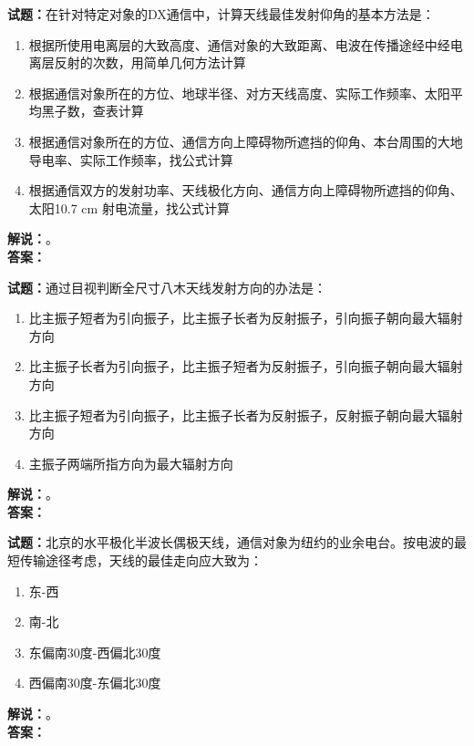 \documentclass{ctexbook}
\begin{document}
\noindent\textbf{试题：}在针对特定对象的DX通信中，计算天线最佳发射仰角的基本方法是：
\begin{enumerate}[leftmargin=3em]
  \item 根据所使用电离层的大致高度、通信对象的大致距离、电波在传播途经中经电离层反射的次数，用简单几何方法计算
  \item 根据通信对象所在的方位、地球半径、对方天线高度、实际工作频率、太阳平均黑子数，查表计算
  \item 根据通信对象所在的方位、通信方向上障碍物所遮挡的仰角、本台周围的大地导电率、实际工作频率，找公式计算
  \item 根据通信双方的发射功率、天线极化方向、通信方向上障碍物所遮挡的仰角、太阳10.7 cm 射电流量，找公式计算
\end{enumerate}
\noindent\textbf{解说：}\textbf{}。\\\noindent\textbf{答案：}

\vspace{\baselineskip}

\noindent\textbf{试题：}通过目视判断全尺寸八木天线发射方向的办法是：
\begin{enumerate}[leftmargin=3em]
  \item 比主振子短者为引向振子，比主振子长者为反射振子，引向振子朝向最大辐射方向
  \item 比主振子长者为引向振子，比主振子短者为反射振子，引向振子朝向最大辐射方向
  \item 比主振子短者为引向振子，比主振子长者为反射振子，反射振子朝向最大辐射方向
  \item 主振子两端所指方向为最大辐射方向
\end{enumerate}
\noindent\textbf{解说：}\textbf{}。\\\noindent\textbf{答案：}

\vspace{\baselineskip}

\noindent\textbf{试题：}北京的水平极化半波长偶极天线，通信对象为纽约的业余电台。按电波的最短传输途径考虑，天线的最佳走向应大致为：
\begin{enumerate}[leftmargin=3em]
  \item 东-西
  \item 南-北
  \item 东偏南30度-西偏北30度
  \item 西偏南30度-东偏北30度
\end{enumerate}
\noindent\textbf{解说：}\textbf{}。\\\noindent\textbf{答案：}

\vspace{\baselineskip}
\end{document}
